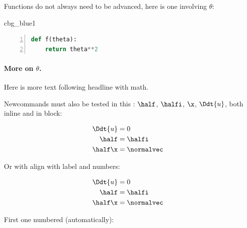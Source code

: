 \n\documentclass[%
oneside,                 %
final,                   %
10pt]{article}
\newenvironment{_cod_tight}[1]{
   \def\FrameCommand{\colorbox{#1}}
   \FrameRule0.6pt\MakeFramed {\FrameRestore}\vskip3mm}
   {\vskip0mm\endMakeFramed}
\newenvironment{cod}[1]{
\bgroup\rmfamily
\fboxsep=0mm\relax
\begin{_cod_tight}{#1}
\list{}{\parsep=-2mm\parskip=0mm\topsep=0pt\leftmargin=2mm
\rightmargin=2\leftmargin\leftmargin=4pt\relax}
\item\relax}
{\endlist\end{_cod_tight}\egroup}
\theoremstyle{definition}
\begin{document}
\begin{enumerate}
Functions do not always need to be advanced, here is one
involving $\theta$:



\begin{cod}{cbg_blue1}\begin{lstlisting}[language=Python,style=myspeciallststyle,numbers=left,numberstyle=\tiny,stepnumber=3,numbersep=15pt,xleftmargin=1mm]
def f(theta):
    return theta**2

\end{lstlisting}\end{cod}
\noindent


\paragraph{More on $\theta$.}
Here is more text following headline with math.

Newcommands must also be tested in this \report:
$\half$, $\halfi$, $\x$, $\Ddt{u}$,
both inline and in block:

\begin{align}
\Ddt{u} &= 0\nonumber
\\ 
\half &= \halfi\\ 
\half\x &= \normalvec
\end{align}

Or with align with label and numbers:

\begin{align}
\Ddt{u} &= 0
\label{aligneq1}
\\ 
\half &= \halfi\\ 
\half\x &= \normalvec
\label{aligneq2}
\end{align}


First one numbered (automatically):


\end{enumerate}
\end{document}

